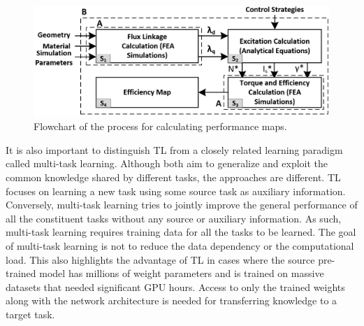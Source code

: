 \begin{figure}[h!]
    \centering
    \includegraphics[width=\textwidth]{Figures/Chp_RNN/Fig_2.png}
    \caption{Flowchart of the process for calculating performance maps.}
    \label{fig:RNN_Fig_2}
\end{figure}

It is also important to distinguish TL from a closely related learning paradigm called multi-task learning. Although both aim to generalize and exploit the common knowledge shared by different tasks, the approaches are different. TL focuses on learning a new task using some source task as auxiliary information. Conversely, multi-task learning tries to jointly improve the general performance of all the constituent tasks without any source or auxiliary information. As such, multi-task learning requires training data for all the tasks to be learned. The goal of multi-task learning is not to reduce the data dependency or the computational load. This also highlights the advantage of TL in cases where the source pre-trained model has millions of weight parameters and is trained on massive datasets that needed significant GPU hours. Access to only the trained weights along with the network architecture is needed for transferring knowledge to a target task.

